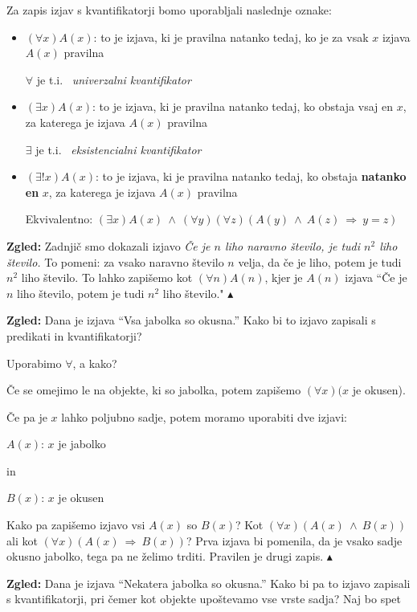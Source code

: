 \documentclass[11pt,paper=b5,footinclude,headinclude]{scrbook} %
\def\inn {{~\wedge~}}
\def\sledi {{~\Rightarrow~}}
\def\zgled{\noindent\textbf{\color{blue} Zgled: }}
\def\kz{{\hfill{\color{blue}$\blacktriangle$}}}%
\begin{document}
Za zapis izjav s kvantifikatorji bomo uporabljali naslednje oznake:
\begin{itemize}
  \item
  $(\forall x) A(x)$: to je izjava, ki je pravilna natanko tedaj, ko je za vsak $x$ izjava $A(x)$ pravilna

$\forall$ je t.i.~\emph{ univerzalni kvantifikator}
  \item
  $(\exists  x) A(x)$: to je izjava, ki je pravilna natanko tedaj, ko obstaja vsaj en $x$, za katerega je izjava $A(x)$ pravilna

$\exists$ je t.i.~\emph{ eksistencialni kvantifikator}

  \item
  $(\exists!  x) A(x)$: to je izjava, ki je pravilna natanko tedaj, ko obstaja \textbf{ natanko en} $x$, za katerega je izjava $A(x)$ pravilna

Ekvivalentno: $(\exists x)A(x) \inn (\forall y)(\forall z)(A(y) \inn A(z) \sledi y = z)$
\end{itemize}

\zgled
Zadnjič smo dokazali izjavo \emph{ Če je $n$ liho naravno število, je tudi $n^2$ liho število.}
To pomeni: za vsako naravno število $n$ velja, da če je liho, potem je tudi $n^2$ liho število.
To lahko zapišemo kot $(\forall n)A(n)$, kjer je $A(n)$ izjava ``Če je $n$ liho število, potem je tudi $n^2$ liho število."
\kz

\medskip
\begin{sloppypar}
\zgled
Dana je izjava ``Vsa jabolka so okusna.''
Kako bi to izjavo zapisali s predikati in kvantifikatorji?

Uporabimo $\forall$, a kako?

Če se omejimo le na objekte, ki so jabolka, potem zapišemo $(\forall x)(x$ je okusen).

Če pa je $x$ lahko poljubno sadje, potem moramo uporabiti dve izjavi:

$A(x)$: $x$ je jabolko

 in

$B(x)$: $x$ je okusen

Kako pa zapišemo izjavo vsi $A(x)$ so $B(x)$? Kot $(\forall x)(A(x)\inn B(x))$
ali kot $(\forall x)(A(x) \sledi B(x))$?
Prva izjava bi pomenila, da je vsako sadje okusno jabolko, tega pa ne želimo trditi. Pravilen je drugi zapis.
\kz
\end{sloppypar}

\medskip
\zgled
Dana je izjava ``Nekatera jabolka so okusna.'' Kako bi pa to izjavo zapisali s kvantifikatorji, pri čemer kot objekte upoštevamo vse vrste sadja?
Naj bo spet
\end{document}

